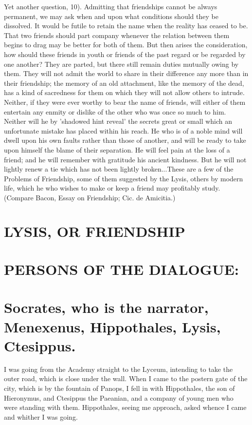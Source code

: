 \documentclass[11pt,letter]{article}
\begin{document}
\par  Yet another question, 10). Admitting that friendships cannot be always permanent, we may ask when and upon what conditions should they be dissolved. It would be futile to retain the name when the reality has ceased to be. That two friends should part company whenever the relation between them begins to drag may be better for both of them. But then arises the consideration, how should these friends in youth or friends of the past regard or be regarded by one another? They are parted, but there still remain duties mutually owing by them. They will not admit the world to share in their difference any more than in their friendship; the memory of an old attachment, like the memory of the dead, has a kind of sacredness for them on which they will not allow others to intrude. Neither, if they were ever worthy to bear the name of friends, will either of them entertain any enmity or dislike of the other who was once so much to him. Neither will he by 'shadowed hint reveal' the secrets great or small which an unfortunate mistake has placed within his reach. He who is of a noble mind will dwell upon his own faults rather than those of another, and will be ready to take upon himself the blame of their separation. He will feel pain at the loss of a friend; and he will remember with gratitude his ancient kindness. But he will not lightly renew a tie which has not been lightly broken...These are a few of the Problems of Friendship, some of them suggested by the Lysis, others by modern life, which he who wishes to make or keep a friend may profitably study. (Compare Bacon, Essay on Friendship; Cic. de Amicitia.)

\par 
\section{
      LYSIS, OR FRIENDSHIP
    }
\par 
\section{
      PERSONS OF THE DIALOGUE:
    }\section{
      Socrates, who is the narrator, Menexenus, Hippothales, Lysis, Ctesippus.
    }
\par 
 
\par  I was going from the Academy straight to the Lyceum, intending to take the outer road, which is close under the wall. When I came to the postern gate of the city, which is by the fountain of Panops, I fell in with Hippothales, the son of Hieronymus, and Ctesippus the Paeanian, and a company of young men who were standing with them. Hippothales, seeing me approach, asked whence I came and whither I was going.
\end{document}
